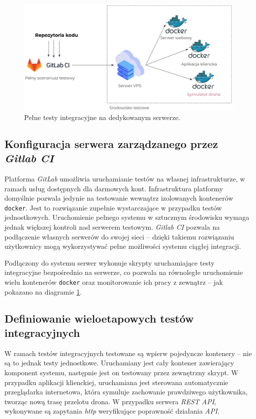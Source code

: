 \begin{figure}[H]
	\centering
	\includegraphics[width=\linewidth]{rys05/integration_tests_diagram.png}
    \caption{
        Pełne testy integracyjne na dedykowanym serwerze.
    }
	\label{integration_tests_diagram}
\end{figure}

\subsection{Konfiguracja serwera zarządzanego przez \textit{Gitlab CI}}

Platforma \textit{GitLab} umożliwia uruchamianie testów na własnej
infrastrukturze, w ramach usług dostępnych dla darmowych kont.
Infrastruktura platformy domyślnie pozwala jedynie
na testowanie wewnątrz izolowanych kontenerów \texttt{docker}.
Jest to rozwiązanie zupełnie wystarczające w przypadku testów jednostkowych.
Uruchomienie pełnego systemu w sztucznym środowisku wymaga jednak
większej kontroli nad serwerem testowym. \textit{Gitlab CI} pozwala
na podłączenie własnych serwerów do swojej sieci -- dzięki takiemu rozwiązaniu
użytkownicy mogą wykorzystywać pełne możliwości systemu ciągłej integracji.

Podłączony do systemu serwer wykonuje skrypty uruchamiające testy integracyjne
bezpośrednio na serwerze, co pozwala na równoległe uruchomienie wielu kontenerów 
\texttt{docker} oraz monitorowanie ich pracy z zewnątrz -- jak pokazano
na diagramie \ref{integration_tests_diagram}.

\subsection{Definiowanie wieloetapowych testów integracyjnych}

W ramach testów integracyjnych testowane są wpierw pojedyncze kontenery --
nie są to jednak testy jednostkowe. Uruchamiany jest cały kontener zawierający
komponent systemu, następnie jest on testowany przez zewnętrzny skrypt.
W przypadku aplikacji klienckiej, uruchamiana jest sterowana automatycznie 
przeglądarka internetowa, która symuluje zachowanie prawdziwego użytkownika,
tworząc nową trasę przelotu drona. W przypadku serwera \textit{REST API}, wykonywane
są zapytania \textit{http} weryfikujące poprawność działania \textit{API}.

